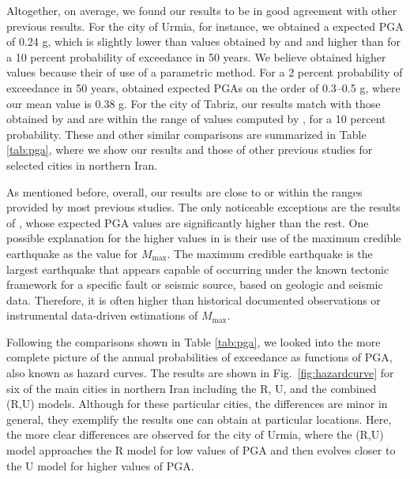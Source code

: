 Altogether, on average, we found our results to be in good agreement with other previous results. For the city of Urmia, for instance, we obtained a expected PGA of 0.24 g, which is slightly lower than values obtained by \citet{BHRC2014} and \citet{Zare2012} and higher than \citet{Khodaverdian_2016_BSSA} for a 10 percent probability of exceedance in 50 years. We believe \citet{Zare2012} obtained higher values because their of use of a parametric method. For a 2 percent probability of exceedance in 50 years, \citet{Golara2014} obtained expected PGAs on the order of 0.3--0.5 g, where our mean value is 0.38 g. For the city of Tabriz, our results match with those obtained by \citet{BHRC2014} and are within the range of values computed by \citet{Zare2012}, for a 10 percent probability. These and other similar comparisons are summarized in Table \ref{tab:pga}, where we show our results and those of other previous studies for selected cities in northern Iran.

As mentioned before, overall, our results are close to or within the ranges provided by most previous studies. The only noticeable exceptions are the results of \citet{Golara2014}, whose expected PGA values are significantly higher than the rest. One possible explanation for the higher values in \citet{Golara2014} is their use of the maximum credible earthquake as the value for $M_{\max}$. The maximum credible earthquake is the largest earthquake that appears capable of occurring under the known tectonic framework for a specific fault or seismic source, based on geologic and seismic data. Therefore, it is often higher than historical documented observations or instrumental data-driven estimations of $M_{\max}$.

Following the comparisons shown in Table \ref{tab:pga}, we looked into the more complete picture of the annual probabilities of exceedance as functions of PGA, also known as hazard curves. The results are shown in Fig.~\ref{fig:hazardcurve} for six of the main cities in northern Iran including the R, U, and the combined (R,U) models. Although for these particular cities, the differences are minor in general, they exemplify the results one can obtain at particular locations. Here, the more clear differences are observed for the city of Urmia, where the (R,U) model approaches the R model for low values of PGA and then evolves closer to the U model for higher values of PGA.

